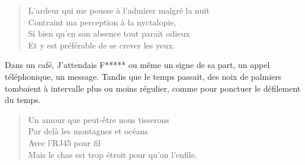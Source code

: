 \begin{verse}
L’ardeur qui me pousse à l’admirer malgré la nuit\\
Contraint ma perception à la nyctalopie,\\
Si bien qu’en son absence tout parait odieux\\
Et y est préférable de se crever les yeux.
\end{verse}

\begin{prose}
Dans un café, J’attendais F***** ou même un signe de sa part, un appel téléphonique, un message. Tandis que le temps passait, des noix de palmiers tombaient à intervalle plus ou moins régulier, comme pour ponctuer le défilement du temps.
\end{prose}

\begin{verse}
Un amour que peut-être nous tisserons\\
Par delà les montagnes et océans\\
Avec l’RJ45 pour fil\\
Mais le chas est trop étroit pour qu’on l’enfile.
\end{verse}

